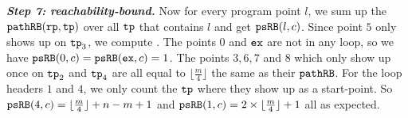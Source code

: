 \textbf{\emph{Step 7: reachability-bound.}}
Now for every program point $l$, we sum up the $\mathtt{pathRB}(\mathtt{rp}, \mathtt{tp})$ over all $\mathtt{tp}$ that contains $l$ and get $\mathtt{psRB}(l, c)$.
Since point $5$ only shows up on $\mathtt{tp}_3$, we compute .
The points $0$ and $\mathtt{ex}$ are not in any loop, so we have $\mathtt{psRB}(0, c) = \mathtt{psRB}(\mathtt{ex}, c) = 1$.
The points $3, 6, 7$ and $8$ which only show up once on $\mathtt{tp}_2$ and $\mathtt{tp}_4$ are all equal to $\lfloor\frac{m}{4}\rfloor$ the same as their $\mathtt{pathRB}$.
For the loop headers $1$ and $4$, we only count the $\mathtt{tp}$ where they show up as a start-point.
So $\mathtt{psRB}(4, c) = \lfloor\frac{m}{4}\rfloor + n - m + 1$ and $\mathtt{psRB}(1,c) = 2 \times \lfloor\frac{m}{4}\rfloor + 1$ all as expected.